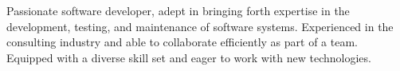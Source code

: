 

\begin{cvparagraph}

Passionate software developer, adept in bringing forth expertise in the development, testing, and maintenance of software systems. Experienced in the consulting industry and able to collaborate efficiently as part of a team. Equipped with a diverse skill set and eager to work with new technologies.
\end{cvparagraph}
